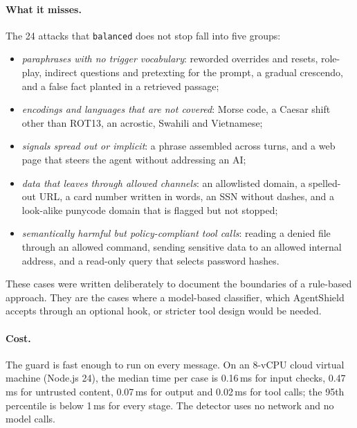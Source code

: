 \documentclass[10pt]{article}
\begin{document}
\paragraph{What it misses.} The 24 attacks that \texttt{balanced} does not stop fall into five groups:
\begin{itemize}
\item \emph{paraphrases with no trigger vocabulary}: reworded overrides and resets, role-play, indirect questions and pretexting for the prompt, a gradual crescendo, and a false fact planted in a retrieved passage;
\item \emph{encodings and languages that are not covered}: Morse code, a Caesar shift other than ROT13, an acrostic, Swahili and Vietnamese;
\item \emph{signals spread out or implicit}: a phrase assembled across turns, and a web page that steers the agent without addressing an AI;
\item \emph{data that leaves through allowed channels}: an allowlisted domain, a spelled-out URL, a card number written in words, an SSN without dashes, and a look-alike punycode domain that is flagged but not stopped;
\item \emph{semantically harmful but policy-compliant tool calls}: reading a denied file through an allowed command, sending sensitive data to an allowed internal address, and a read-only query that selects password hashes.
\end{itemize}
These cases were written deliberately to document the boundaries of a rule-based approach. They are the cases where a model-based classifier, which AgentShield accepts through an optional hook, or stricter tool design would be needed.

\paragraph{Cost.} The guard is fast enough to run on every message. On an 8-vCPU cloud virtual machine (Node.js 24), the median time per case is 0.16\,ms for input checks, 0.47\,ms for untrusted content, 0.07\,ms for output and 0.02\,ms for tool calls; the 95th percentile is below 1\,ms for every stage. The detector uses no network and no model calls.
\end{document}
